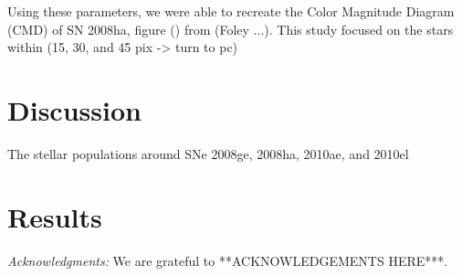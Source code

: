 \documentclass[preprint2]{aastex}
\begin{document}
Using these parameters, we were able to recreate the Color Magnitude Diagram (CMD)
of SN 2008ha, figure () from (Foley ...). This study focused on the stars within
 (15, 30, and 45 pix -> turn to pc)


\section{Discussion}
The stellar populations around SNe 2008ge, 2008ha, 2010ae, and 2010el

\section{Results}

{\it Acknowledgments:} We are grateful to **ACKNOWLEDGEMENTS HERE***.

\end{document}
